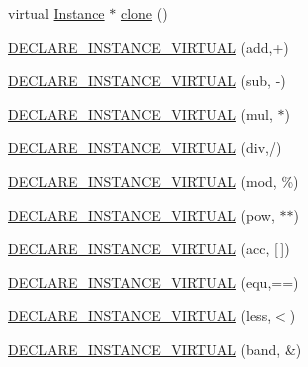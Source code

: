 \begin{DoxyCompactItemize}
virtual \mbox{\hyperlink{class_erable_1_1_erable_1_1_types_1_1_instance}{Instance}} $\ast$ \mbox{\hyperlink{class_erable_1_1_erable_1_1_types_1_1_instance_a87d644219b7d4706a94c0845a31bbbcc}{clone}} ()
\item 
\mbox{\hyperlink{class_erable_1_1_erable_1_1_types_1_1_instance_a038523b9fe697b442d777a4b2010ce4e}{D\+E\+C\+L\+A\+R\+E\+\_\+\+I\+N\+S\+T\+A\+N\+C\+E\+\_\+\+V\+I\+R\+T\+U\+AL}} (add,+)
\item 
\mbox{\hyperlink{class_erable_1_1_erable_1_1_types_1_1_instance_ae411379485bf68a3f6fa52e3347f4f2c}{D\+E\+C\+L\+A\+R\+E\+\_\+\+I\+N\+S\+T\+A\+N\+C\+E\+\_\+\+V\+I\+R\+T\+U\+AL}} (sub, -\/)
\item 
\mbox{\hyperlink{class_erable_1_1_erable_1_1_types_1_1_instance_a950efe2d5e34d515307e50745658eee2}{D\+E\+C\+L\+A\+R\+E\+\_\+\+I\+N\+S\+T\+A\+N\+C\+E\+\_\+\+V\+I\+R\+T\+U\+AL}} (mul, $\ast$)
\item 
\mbox{\hyperlink{class_erable_1_1_erable_1_1_types_1_1_instance_a33cec0a7241e117e17a784303f5f74f9}{D\+E\+C\+L\+A\+R\+E\+\_\+\+I\+N\+S\+T\+A\+N\+C\+E\+\_\+\+V\+I\+R\+T\+U\+AL}} (div,/)
\item 
\mbox{\hyperlink{class_erable_1_1_erable_1_1_types_1_1_instance_adb5e63b51822f1714aa44aa301aeb5cf}{D\+E\+C\+L\+A\+R\+E\+\_\+\+I\+N\+S\+T\+A\+N\+C\+E\+\_\+\+V\+I\+R\+T\+U\+AL}} (mod, \%)
\item 
\mbox{\hyperlink{class_erable_1_1_erable_1_1_types_1_1_instance_a55af62be52717138532b8c8b8625fc54}{D\+E\+C\+L\+A\+R\+E\+\_\+\+I\+N\+S\+T\+A\+N\+C\+E\+\_\+\+V\+I\+R\+T\+U\+AL}} (pow, $\ast$$\ast$)
\item 
\mbox{\hyperlink{class_erable_1_1_erable_1_1_types_1_1_instance_a988c962043be33e231faf5ca5eb02d21}{D\+E\+C\+L\+A\+R\+E\+\_\+\+I\+N\+S\+T\+A\+N\+C\+E\+\_\+\+V\+I\+R\+T\+U\+AL}} (acc, \mbox{[}$\,$\mbox{]})
\item 
\mbox{\hyperlink{class_erable_1_1_erable_1_1_types_1_1_instance_a64a864420164f958eabc2129191aac70}{D\+E\+C\+L\+A\+R\+E\+\_\+\+I\+N\+S\+T\+A\+N\+C\+E\+\_\+\+V\+I\+R\+T\+U\+AL}} (equ,==)
\item 
\mbox{\hyperlink{class_erable_1_1_erable_1_1_types_1_1_instance_ae05a322f1b425cb5d553228f76abedb2}{D\+E\+C\+L\+A\+R\+E\+\_\+\+I\+N\+S\+T\+A\+N\+C\+E\+\_\+\+V\+I\+R\+T\+U\+AL}} (less,$<$)
\item 
\mbox{\hyperlink{class_erable_1_1_erable_1_1_types_1_1_instance_a833ce030d789e97a6fb3f27336792a8b}{D\+E\+C\+L\+A\+R\+E\+\_\+\+I\+N\+S\+T\+A\+N\+C\+E\+\_\+\+V\+I\+R\+T\+U\+AL}} (band, \&)
\item 
$$
\end{DoxyCompactItemize}
